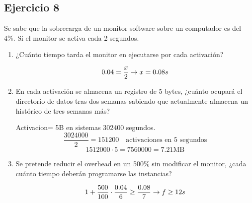 \subsection{Ejercicio 8}
\noindent
Se sabe que la sobrecarga de un monitor software sobre un computador es del 4\%. Si el monitor se activa cada 2 segundos.
\begin{enumerate}
    \item ¿Cuánto tiempo tarda el monitor en ejecutarse por cada activación?
\begin{tcolorbox}[colback=white,colframe=cyan!50!black,fonttitle=\bfseries]
\[
0.04=\dfrac{x}{2}\rightarrow x=0.08s
\]
\end{tcolorbox}    
    \item En cada activación se almacena un registro de 5 bytes, ¿cuánto ocupará el directorio de datos tras dos semanas sabiendo que actualmente almacena un histórico de tres semanas más?
\begin{tcolorbox}[colback=white,colframe=cyan!50!black,fonttitle=\bfseries]
Activacion= 5B en sistemas 302400 segundos.
\[
\dfrac{3024000}{2}=151200\quad\text{activaciones en 5 segundos}
\]
\[
1512000\cdot 5=7560000=7.21\text{MB}
\]
\end{tcolorbox}    
    \item Se pretende reducir el overhead en un 500\% sin modificar el monitor, ¿cada cuánto tiempo deberán programarse las instancias?
\begin{tcolorbox}[colback=white,colframe=cyan!50!black,fonttitle=\bfseries]
\[
1+\dfrac{500}{100}\cdot\dfrac{0.04}{6}\geq\dfrac{0.08}{7}\rightarrow f\geq 12s
\]
\end{tcolorbox}    
\end{enumerate}
